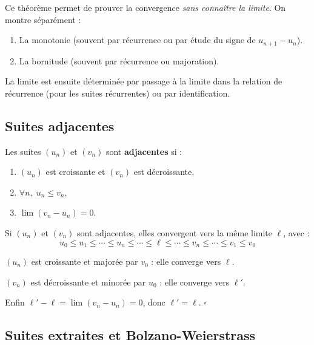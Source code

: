 \begin{intuitionbox}
Ce théorème permet de prouver la convergence \emph{sans connaître la limite}. On montre séparément :
\begin{enumerate}[leftmargin=1cm]
  \item La monotonie (souvent par récurrence ou par étude du signe de $u_{n+1} - u_n$).
  \item La bornitude (souvent par récurrence ou majoration).
\end{enumerate}
La limite est ensuite déterminée par passage à la limite dans la relation de récurrence (pour les suites récurrentes) ou par identification.
\end{intuitionbox}

\subsection{Suites adjacentes}

\begin{defbox}
Les suites $(u_n)$ et $(v_n)$ sont \textbf{adjacentes} si :
\begin{enumerate}[leftmargin=1cm]
  \item $(u_n)$ est croissante et $(v_n)$ est décroissante,
  \item $\forall n,\; u_n \leqslant v_n$,
  \item $\lim(v_n - u_n) = 0$.
\end{enumerate}
\end{defbox}

\begin{thmbox}
Si $(u_n)$ et $(v_n)$ sont adjacentes, elles convergent vers la même limite $\ell$, avec :
\[
  u_0 \leqslant u_1 \leqslant \cdots \leqslant u_n \leqslant \cdots \leqslant \ell \leqslant \cdots \leqslant v_n \leqslant \cdots \leqslant v_1 \leqslant v_0
\]
\end{thmbox}

\begin{proofbox}
$(u_n)$ est croissante et majorée par $v_0$ : elle converge vers $\ell$.

$(v_n)$ est décroissante et minorée par $u_0$ : elle converge vers $\ell'$.

Enfin $\ell' - \ell = \lim(v_n - u_n) = 0$, donc $\ell' = \ell$. \hfill$\square$
\end{proofbox}


\subsection{Suites extraites et Bolzano-Weierstrass}

